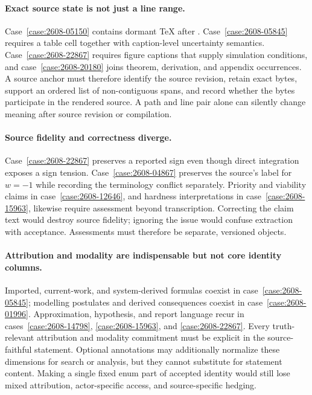 \paragraph{Exact source state is not just a line range.}
Case~\ref{case:2608-05150} contains dormant TeX after \verb||. Case~\ref{case:2608-05845} requires a table cell together with caption-level uncertainty semantics. Case~\ref{case:2608-22867} requires figure captions that supply simulation conditions, and case~\ref{case:2608-20180} joins theorem, derivation, and appendix occurrences. A source anchor must therefore identify the source revision, retain exact bytes, support an ordered list of non-contiguous spans, and record whether the bytes participate in the rendered source. A path and line pair alone can silently change meaning after source revision or compilation.

\paragraph{Source fidelity and correctness diverge.}
Case~\ref{case:2608-22867} preserves a reported sign even though direct integration exposes a sign tension. Case~\ref{case:2608-04867} preserves the source's label for $w=-1$ while recording the terminology conflict separately. Priority and viability claims in case~\ref{case:2608-12646}, and hardness interpretations in case~\ref{case:2608-15963}, likewise require assessment beyond transcription. Correcting the claim text would destroy source fidelity; ignoring the issue would confuse extraction with acceptance. Assessments must therefore be separate, versioned objects.

\paragraph{Attribution and modality are indispensable but not core identity columns.}
Imported, current-work, and system-derived formulas coexist in case~\ref{case:2608-05845}; modelling postulates and derived consequences coexist in case~\ref{case:2608-01996}. Approximation, hypothesis, and report language recur in cases~\ref{case:2608-14798}, \ref{case:2608-15963}, and \ref{case:2608-22867}. Every truth-relevant attribution and modality commitment must be explicit in the source-faithful statement. Optional annotations may additionally normalize these dimensions for search or analysis, but they cannot substitute for statement content. Making a single fixed enum part of accepted identity would still lose mixed attribution, actor-specific access, and source-specific hedging.

